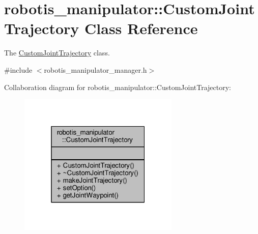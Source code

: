 \hypertarget{classrobotis__manipulator_1_1_custom_joint_trajectory}{}\section{robotis\+\_\+manipulator\+:\+:Custom\+Joint\+Trajectory Class Reference}
\label{classrobotis__manipulator_1_1_custom_joint_trajectory}


The \hyperlink{classrobotis__manipulator_1_1_custom_joint_trajectory}{Custom\+Joint\+Trajectory} class.  




{\ttfamily \#include $<$robotis\+\_\+manipulator\+\_\+manager.\+h$>$}



Collaboration diagram for robotis\+\_\+manipulator\+:\+:Custom\+Joint\+Trajectory\+:\nopagebreak
\begin{figure}[H]
\begin{center}
\leavevmode
\includegraphics[width=217pt]{classrobotis__manipulator_1_1_custom_joint_trajectory__coll__graph}
\end{center}
\end{figure}
